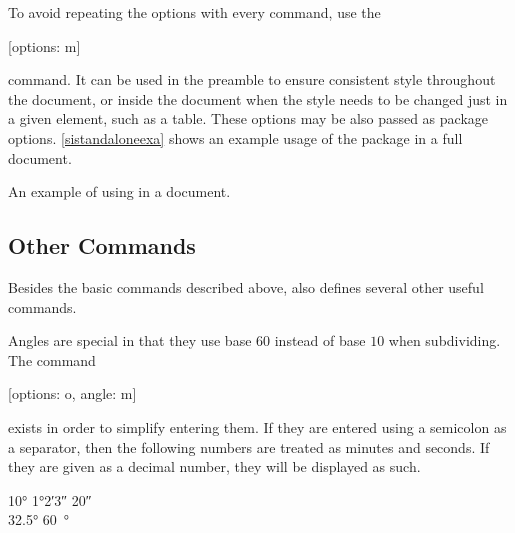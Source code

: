 To avoid repeating the options with every command, use the
\begin{lscommand}
  [options: m]
\end{lscommand}
command. It can be used in the preamble to ensure consistent style throughout
the document, or inside the document when the style needs to be changed just
in a given element, such as a table. These options may be also passed as package
options. \autoref{sistandaloneexa} shows an example usage of the package in
a full document.
\begin{listing}
  \caption{An example of using  in a document.}%
  \label{sistandaloneexa}
\end{listing}

\subsection{Other  Commands}

Besides the basic commands described above,  also defines several
other useful commands.

Angles are special in that they use base \(60\) instead of base \(10\) when
subdividing. The command
\begin{lscommand}
  [options: o, angle: m]
\end{lscommand}
exists in order to simplify entering them. If they are entered using a semicolon
as a separator, then the following numbers are treated as minutes and seconds.
If they are given as a decimal number, they will be displayed as such.
\begin{example}
\ang{10}
\qquad %
\ang{1;2;3}
\qquad %
\ang{;;20} \\
\ang{32.5}
\qquad %
\qty{60}{\degree}
\end{example}

